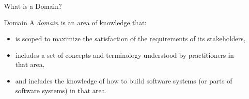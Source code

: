 \begin{frame}{What is a Domain?}
	\begin{mycolumns}[animation=none]
		\begin{definition}{Domain  } %
			\mycitebegin A \emph{domain} is an area of knowledge that:
			\begin{itemize}
				\item is scoped to maximize the satisfaction of the requirements of its stakeholders,
				\item includes a set of concepts and terminology understood by practitioners in that area,
				\item and includes the knowledge of how to build software systems (or parts of
				software systems) in that area.\myciteend
			\end{itemize}
		\end{definition}
	\mynextcolumn

		\hfill{}\hfill{}

		\hfill{}
	\end{mycolumns}
\end{frame}

